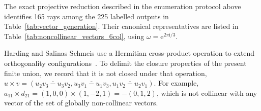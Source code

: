 \documentclass[%
  reprint,
  superscriptaddress,
  showpacs,
  showkeys,
  amsmath,amssymb,
  pra,
  longbibliography,
  floatfix,
  x11names
]{revtex4-2}
\newcommand{\ii}{\mathrm{i}}
\newenvironment{revision}{\begingroup\color{revisionblue}}{\endgroup}
\begin{document}
\begin{revision}
The exact projective reduction described in the enumeration protocol above identifies 165 rays among the 225 labelled outputs in Table~\ref{tab:vector_generation}.  Their canonical representatives are listed in Table~\ref{tab:noncollinear_vectors_6col}, using $\omega=\mathrm{e}^{2\pi\ii{}/3}$.

Harding and Salinas Schmeis use a Hermitian cross-product operation to extend orthogonality configurations~\cite{harding2025remarksIJTP}.  To delimit the closure properties of the present finite union, we record that it is not closed under that operation,
\(
u\times v =  (\overline{u_2v_3-u_3v_2},\overline{u_3v_1-u_1v_3},\overline{u_1v_2-u_2v_1})
\).
For example,
$a_{11} \times d_{21} = (1,0,0) \times (1,-2,1) = -(0,1,2)$, which is not collinear with any vector of the set of globally non-collinear vectors.
\end{revision}
\end{document}
